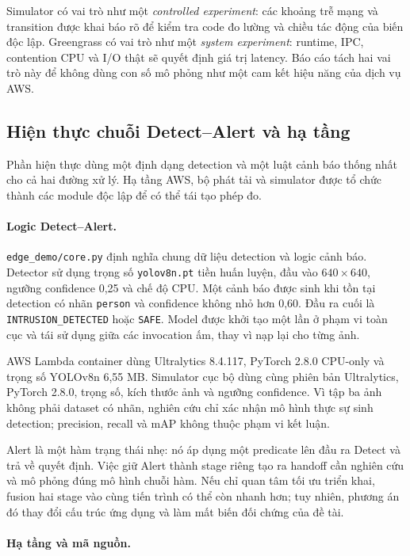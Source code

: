 Simulator có vai trò như một \emph{controlled experiment}: các khoảng trễ mạng và
transition được khai báo rõ để kiểm tra code đo lường và chiều tác động của biến
độc lập. Greengrass có vai trò như một \emph{system experiment}: runtime, IPC,
contention CPU và I/O thật sẽ quyết định giá trị latency. Báo cáo tách hai vai trò
này để không dùng con số mô phỏng như một cam kết hiệu năng của dịch vụ AWS.

\subsection{Hiện thực chuỗi Detect--Alert và hạ tầng}

Phần hiện thực dùng một định dạng detection và một luật cảnh báo thống nhất cho cả
hai đường xử lý. Hạ tầng AWS, bộ phát tải và simulator được tổ chức thành các module
độc lập để có thể tái tạo phép đo.

\paragraph{Logic Detect--Alert.}

\texttt{edge\_demo/core.py} định nghĩa chung dữ liệu detection và logic cảnh báo.
Detector sử dụng trọng số \texttt{yolov8n.pt} tiền huấn luyện, đầu vào
$640\times640$, ngưỡng confidence 0,25 và chế độ CPU. Một cảnh báo được sinh khi
tồn tại detection có nhãn \texttt{person} và confidence không nhỏ hơn 0,60. Đầu
ra cuối là \texttt{INTRUSION\_DETECTED} hoặc \texttt{SAFE}. Model được khởi tạo
một lần ở phạm vi toàn cục và tái sử dụng giữa các invocation ấm, thay vì nạp lại
cho từng ảnh.

AWS Lambda container dùng Ultralytics 8.4.117, PyTorch 2.8.0 CPU-only và trọng số
YOLOv8n 6,55 MB. Simulator cục bộ dùng cùng phiên bản Ultralytics, PyTorch 2.8.0,
trọng số, kích thước ảnh và ngưỡng confidence. Vì tập ba ảnh không phải dataset có
nhãn, nghiên cứu chỉ xác nhận mô hình thực sự sinh detection; precision, recall và
mAP không thuộc phạm vi kết luận.

Alert là một hàm trạng thái nhẹ: nó áp dụng một predicate lên đầu ra Detect và trả
về quyết định. Việc giữ Alert thành stage riêng tạo ra handoff cần nghiên cứu và
mô phỏng đúng mô hình chuỗi hàm. Nếu chỉ quan tâm tối ưu triển khai, fusion hai
stage vào cùng tiến trình có thể còn nhanh hơn; tuy nhiên, phương án đó thay đổi
cấu trúc ứng dụng và làm mất biến đối chứng của đề tài.

\paragraph{Hạ tầng và mã nguồn.}

